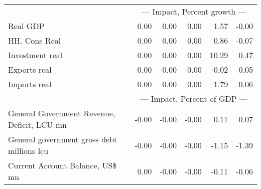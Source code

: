 \documentclass{article}
\begin{document}
\begin{table}[ht]
\begin{tabular}{lrrrrr}
&\multicolumn{5}{c}{{--- Impact, Percent growth ---}}                          \\
Real GDP & 0.00 & 0.00 & 0.00 & 1.57 & -0.00 \\
HH. Cons Real & 0.00 & 0.00 & 0.00 & 0.86 & -0.07 \\
Investment real & 0.00 & 0.00 & 0.00 & 10.29 & 0.47 \\
Exports real & -0.00 & -0.00 & -0.00 & -0.02 & -0.05 \\
Imports real & 0.00 & 0.00 & 0.00 & 1.79 & 0.06 \\
&\multicolumn{5}{c}{{--- Impact, Percent of GDP ---}}                          \\
General Government Revenue, Deficit, LCU mn & -0.00 & -0.00 & -0.00 & 0.11 & 0.07 \\
General government gross debt millions lcu & -0.00 & -0.00 & -0.00 & -1.15 & -1.39 \\
Current Account Balance, US\$ mn & 0.00 & -0.00 & -0.00 & -0.11 & -0.06 \\
\bottomrule
\end{tabular}
\end{table}
\end{document}
